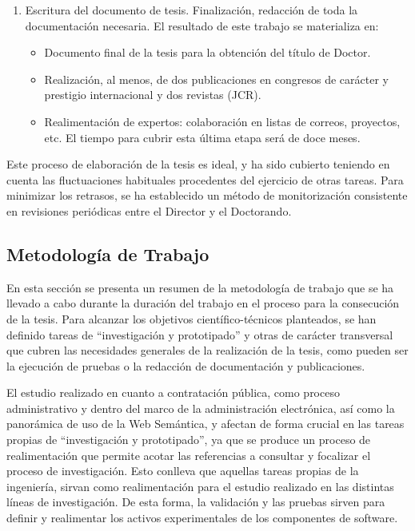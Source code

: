 \begin{enumerate}
\begin{itemize}
 \end{itemize}
  \item Escritura del documento de tesis. Finalización, redacción de toda la documentación necesaria.
  El resultado de este trabajo se materializa en:
  \begin{itemize}
    \item Documento final de la tesis para la obtención del título de Doctor.
   \item Realización, al menos, de dos publicaciones en congresos de carácter y prestigio internacional y dos revistas (JCR).  
   \item Realimentación de expertos: colaboración en listas de correos, proyectos, etc. El tiempo para cubrir esta última etapa será de doce meses.
  \end{itemize}

\end{enumerate}

Este proceso de elaboración de la tesis es ideal, y ha sido cubierto teniendo en cuenta
las fluctuaciones habituales procedentes del ejercicio de otras tareas. Para minimizar
los retrasos, se ha establecido un método de monitorización consistente en revisiones periódicas entre el Director y el Doctorando. 

\subsection{Metodología de Trabajo}
En esta sección se presenta un resumen de la metodología de trabajo que se ha llevado a cabo durante la duración 
del trabajo en el proceso para la consecución de la tesis. Para alcanzar los objetivos científico-técnicos planteados, se han definido
tareas de ``investigación y prototipado'' y otras de carácter transversal que cubren las necesidades generales de la 
realización de la tesis, como pueden ser la ejecución de pruebas o la redacción de documentación y publicaciones.

El estudio realizado en cuanto a contratación pública, como proceso administrativo y dentro del marco de la administración
electrónica, así como la panorámica de uso de la Web Semántica, \linkeddata y \opendata afectan de forma crucial
en las tareas propias de ``investigación y prototipado'', ya que se produce un proceso de realimentación que permite
acotar las referencias a consultar y focalizar el proceso de investigación. Esto conlleva que aquellas tareas
propias de la ingeniería, sirvan como realimentación para el estudio realizado en las distintas líneas
de investigación. De esta forma, la validación y las pruebas sirven para definir y realimentar los activos
experimentales de los componentes de software.

